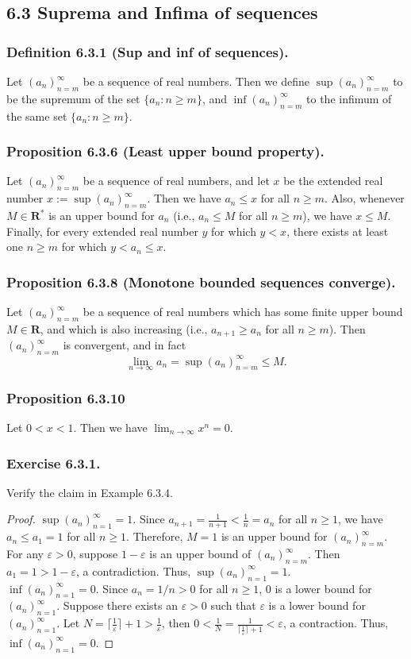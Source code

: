 \documentclass[12pt, letter]{article}
\newcommand{\an}{(a_n)_{n=m}^\infty}
\begin{document}
\subsection*{6.3 Suprema and Infima of sequences}
\subsubsection*{Definition 6.3.1 (Sup and inf of sequences).}
Let $\an$ be a sequence of real numbers. Then we define $\sup\an$ to be the supremum of the set $\{a_n:n\geq m\}$, and $\inf\an$ to the infimum of the same set 
$\{a_n:n\geq m\}$.
\subsubsection*{Proposition 6.3.6 (Least upper bound property).}
Let $\an$ be a sequence of real numbers, and let $x$ be the extended real number $x:=\sup\an$. Then we have $a_n\leq x$ for all $n\geq m$. Also, whenever $M\in\mathbf{R^*}$ is an
upper bound for $a_n$ (i.e., $a_n\leq M$ for all $n\geq m$), we have $x\leq M$. Finally, for every extended real number $y$ for which $y<x$, there exists 
at least one $n\geq m$ for which $y<a_n\leq x$.
\subsubsection*{Proposition 6.3.8 (Monotone bounded sequences converge).}
Let $\an$ be a sequence of real numbers which has some finite upper bound $M\in\mathbf{R}$, and which is also increasing (i.e., $a_{n+1}\geq a_n$ for all $n\geq m$).
Then $\an$ is convergent, and in fact $$\lim_{n\to\infty}a_n=\sup\an\leq M.$$
\subsubsection*{Proposition 6.3.10}
Let $0<x<1$. Then we have $\lim_{n\to\infty}x^n=0$.
\subsubsection*{Exercise 6.3.1.}
Verify the claim in Example 6.3.4.
\begin{proof}
    $\sup(a_n)_{n=1}^\infty=1$. Since $a_{n+1}=\frac{1}{n+1}<\frac{1}{n}=a_n$ for all $n\geq 1$, we have $a_n\leq a_1=1$ for all $n\geq 1$. Therefore, $M=1$ is an upper bound for $\an$.
    For any $\varepsilon>0$, suppose $1-\varepsilon$ is an upper bound of $\an$. Then $a_1=1>1-\varepsilon$, a contradiction. Thus, $\sup(a_n)_{n=1}^\infty=1$.\\
    $\inf(a_n)_{n=1}^\infty=0$. Since $a_n=1/n>0$ for all $n\geq 1$, 0 is a lower bound for $(a_n)_{n=1}^\infty$. Suppose there exists an $\varepsilon>0$ such that $\varepsilon$ is a lower bound 
    for $(a_n)_{n=1}^\infty$. Let $N=\lceil\frac{1}{\varepsilon}\rceil+1>\frac{1}{\varepsilon}$, then $0<\frac{1}{N}=\frac{1}{\lceil\frac{1}{\varepsilon}\rceil+1}<\varepsilon$, a contraction. 
    Thus, $\inf(a_n)_{n=1}^\infty=0$.
\end{proof}
\end{document}
